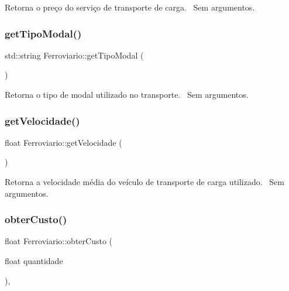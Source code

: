 Retorna o preço do serviço de transporte de carga.~\newline
Sem argumentos.\mbox{\label{classFerroviario_a6d75f014c46c8c24ed2c121baa1cda0b}} 
\subsubsection{\texorpdfstring{get\+Tipo\+Modal()}{getTipoModal()}}
{\footnotesize\ttfamily std\+::string Ferroviario\+::get\+Tipo\+Modal (\begin{DoxyParamCaption}{ }\end{DoxyParamCaption})}

Retorna o tipo de modal utilizado no transporte.~\newline
Sem argumentos.\mbox{\label{classFerroviario_a643ac2394764eb83835e63088f116ac4}} 
\subsubsection{\texorpdfstring{get\+Velocidade()}{getVelocidade()}}
{\footnotesize\ttfamily float Ferroviario\+::get\+Velocidade (\begin{DoxyParamCaption}{ }\end{DoxyParamCaption})}

Retorna a velocidade média do veículo de transporte de carga utilizado.~\newline
Sem argumentos.\mbox{\label{classFerroviario_a691452311fe49e6573e47220fa372d15}} 
\subsubsection{\texorpdfstring{obter\+Custo()}{obterCusto()}}
{\footnotesize\ttfamily float Ferroviario\+::obter\+Custo (\begin{DoxyParamCaption}\item[{float}]{quantidade }\end{DoxyParamCaption})\hspace{0.3cm}{\ttfamily [override]}, {\ttfamily [virtual]}}

